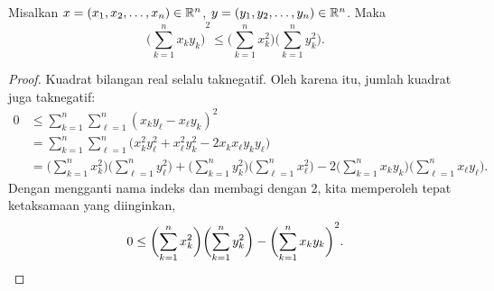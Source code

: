 \begin{lemma}
Misalkan $x =(x_1,x_2,\ldots,x_n) \in {\mathbb{R}}^n$, $y =(y_1,y_2,\ldots,y_n) \in {\mathbb{R}}^n$.
Maka
\begin{equation*}
{\biggl( \sum_{k=1}^n x_k y_k \biggr)}^2
\leq
\biggl(\sum_{k=1}^n x_k^2 \biggr)
\biggl(\sum_{k=1}^n y_k^2 \biggr) .
\end{equation*}
\end{lemma}

\begin{proof}
Kuadrat bilangan real selalu taknegatif.  Oleh karena itu, jumlah kuadrat
juga taknegatif:
\begin{equation*}
\begin{split}
0 & \leq 
\sum_{k=1}^n \sum_{\ell=1}^n {(x_k y_\ell - x_\ell y_k)}^2
\\
& =
\sum_{k=1}^n \sum_{\ell=1}^n \bigl( x_k^2 y_\ell^2 + x_\ell^2 y_k^2 - 2 x_k
x_\ell y_k
y_\ell \bigr)
\\
& =
\biggl( \sum_{k=1}^n x_k^2 \biggr)
\biggl( \sum_{\ell=1}^n y_\ell^2 \biggr)
+
\biggl( \sum_{k=1}^n y_k^2 \biggr)
\biggl( \sum_{\ell=1}^n x_\ell^2 \biggr)
-
2
\biggl( \sum_{k=1}^n x_k y_k \biggr)
\biggl( \sum_{\ell=1}^n x_\ell y_\ell \biggr) .
\end{split}
\end{equation*}
Dengan mengganti nama indeks dan membagi dengan 2, kita memperoleh tepat ketaksamaan yang diinginkan,
\begin{equation*}
0 \leq 
\biggl( \sum_{k=1}^n x_k^2 \biggr)
\biggl( \sum_{k=1}^n y_k^2 \biggr)
-
{\biggl( \sum_{k=1}^n x_k y_k \biggr)}^2 .
\qedhere
\end{equation*}
\end{proof}

